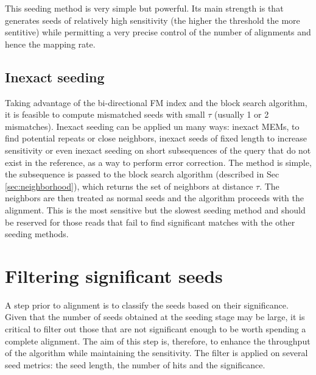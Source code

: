 This seeding method is very simple but powerful. Its main strength is
that generates seeds of relatively high sensitivity (the higher the
threshold the more sentitive) while permitting a very precise control
of the number of alignments and hence the mapping rate.

\subsection{Inexact seeding}
Taking advantage of the bi-directional FM index and the block search
algorithm, it is feasible to compute mismatched seeds with small
$\tau$ (usually 1 or 2 mismatches). Inexact seeding can be applied un
many ways: inexact MEMs, to find potential repeats or close neighbors,
inexact seeds of fixed length to increase sensitivity or even inexact
seeding on short subsequences of the query that do not exist in the
reference, as a way to perform error correction. The method is
simple, the subsequence is passed to the block search
algorithm (described in Sec \ref{sec:neighborhood}), which returns the
set of neighbors at distance $\tau$. The neighbors are then treated as
normal seeds and the algorithm proceeds with the alignment. This is
the most sensitive but the slowest seeding method and should be
reserved for those reads that fail to find significant matches with
the other seeding methods. 

\section{Filtering significant seeds}
A step prior to alignment is to classify the seeds based on their
significance. Given that the number of seeds obtained at the seeding
stage may be large, it is critical to filter out those that are not
significant enough to be worth spending a complete alignment. The 
aim of this step is, therefore, to enhance the throughput of the
algorithm while maintaining the sensitivity. The filter is applied on
several seed metrics: the seed length, the number of hits and the
significance. 
